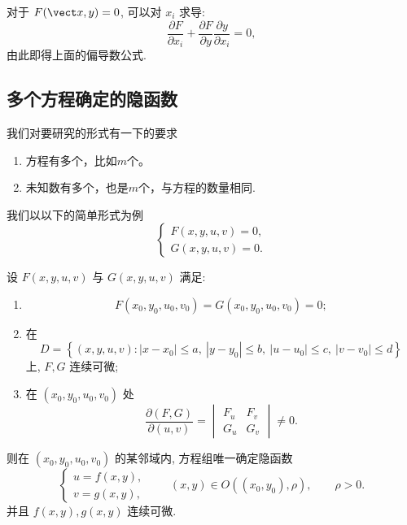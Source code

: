 对于 $F(\vect x,y)=0$, 可以对 $x_i$ 求导:
\[
\frac{\partial F}{\partial x_i}
+
\frac{\partial F}{\partial y}
\frac{\partial y}{\partial x_i}
=0,
\]
由此即得上面的偏导数公式.



\subsection*{多个方程确定的隐函数}
我们对要研究的形式有一下的要求
\begin{enumerate}
	\item 方程有多个，比如$m$个。
	\item 未知数有多个，也是$m$个，与方程的数量相同.
\end{enumerate}
我们以以下的简单形式为例
\[
\begin{cases}
F(x,y,u,v)=0,\\
G(x,y,u,v)=0.
\end{cases}
\]

\begin{theorem}
	设 $F(x,y,u,v)$ 与 $G(x,y,u,v)$ 满足:
	\begin{enumerate}
		\item
		\[
		F(x_0,y_0,u_0,v_0)
		=
		G(x_0,y_0,u_0,v_0)
		=0;
		\]
		\item 在
		\[
		D=
		\left\{
		(x,y,u,v):
		|x-x_0|\le a,\ |y-y_0|\le b,\
		|u-u_0|\le c,\ |v-v_0|\le d
		\right\}
		\]
		上, $F,G$ 连续可微;
		\item 在 $(x_0,y_0,u_0,v_0)$ 处
		\[
		\frac{\partial(F,G)}{\partial(u,v)}
		=
		\begin{vmatrix}
		F_u&F_v\\
		G_u&G_v
		\end{vmatrix}
		\ne0.
		\]
	\end{enumerate}
	则在 $(x_0,y_0,u_0,v_0)$ 的某邻域内, 方程组唯一确定隐函数
	\[
	\begin{cases}
	u=f(x,y),\\
	v=g(x,y),
	\end{cases}
	\qquad
	(x,y)\in O((x_0,y_0),\rho),
	\qquad \rho>0.
	\]
	并且 $f(x,y),g(x,y)$ 连续可微.
\end{theorem}

